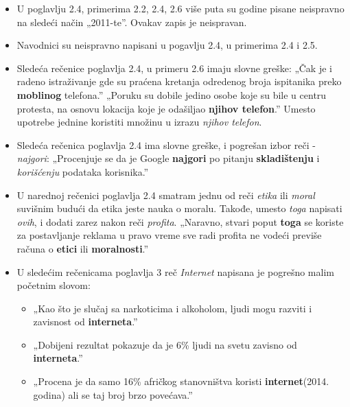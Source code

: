 \documentclass[a4paper]{report}
\begin{document}
\begin{itemize}
    \item  U poglavlju 2.4, primerima 2.2, 2.4, 2.6 više puta su godine pisane neispravno na sledeći način „2011-te”. Ovakav zapis je neispravan.
\end{itemize}
\begin{itemize}
    \item  Navodnici su neispravno napisani u pogavlju 2.4, u primerima 2.4 i 2.5.
\end{itemize}
\begin{itemize}
    \item Sledeća rečenice poglavlja 2.4, u primeru 2.6 imaju slovne greške: \newline
    „Čak je i radeno istraživanje gde su praćena kretanja odredenog broja ispitanika preko \textbf{moblinog} telefona.”
    „Poruku su dobile jedino osobe koje su bile u centru protesta, na osnovu lokacija koje je odašiljao \textbf{njihov telefon}.”\newline
    Umesto upotrebe jednine koristiti množinu u izrazu \textit{njihov telefon}.
\end{itemize}
\begin{itemize}
    \item Sledeća rečenica poglavlja 2.4 ima slovne greške, i pogrešan izbor reči -  \textit{najgori}:\newline
    „Procenjuje se da je Google \textbf{najgori} po pitanju \textbf{skladištenju} i \textit{korišćenju} podataka korisnika.”
\end{itemize}
\begin{itemize}
    \item U narednoj rečenici poglavlja 2.4 smatram jednu od reči \textit{etika} ili \textit{moral} suvišnim budući da etika jeste nauka o moralu. Takođe, umesto \textit{toga} napisati \textit{ovih}, i dodati zarez nakon reči \textit{profita}.
    \newline
    „Naravno, stvari poput \textbf{toga} se koriste za postavljanje reklama u pravo vreme sve radi profita ne vodeći previše računa o \textbf{etici} ili \textbf{moralnosti}.”
\end{itemize}
\begin{itemize}
    \item U sledećim rečenicama poglavlja 3 reč \textit{Internet} napisana je pogrešno malim početnim slovom:\newline
    \begin{itemize}
        \item  „Kao što je slučaj sa narkoticima i alkoholom, ljudi mogu razviti i zavisnost od \textbf{interneta}.”
    \end{itemize}
    \begin{itemize}
        \item „Dobijeni rezultat pokazuje da je 6\% ljudi na svetu zavisno od \textbf{interneta}.”
    \end{itemize}
    \begin{itemize}
        \item  „Procena je da samo 16\% afričkog stanovništva koristi \textbf{internet}(2014. godina) ali se taj broj brzo povećava.”
    \end{itemize}
\end{itemize}
\end{document}
